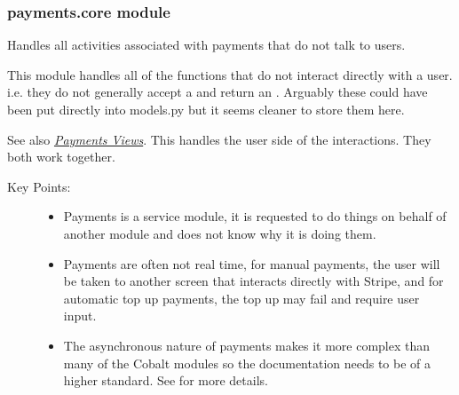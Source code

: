 \documentclass[letterpaper,10pt,english]{sphinxmanual}
\begin{document}
\subsubsection{payments.core module}
\label{\detokenize{payments:module-payments.core}}\label{\detokenize{payments:payments-core-module}}
Handles all activities associated with payments that do not talk to users.

This module handles all of the functions that do not interact directly with
a user. i.e. they do not generally accept a  and return an
. Arguably these could have been put directly into models.py
but it seems cleaner to store them here.

See also {\hyperref[\detokenize{payments:module-payments.views}]{\emph{Payments Views}}}. This handles the user side of the interactions.
They both work together.
\begin{description}
\item[{Key Points:}] \leavevmode\begin{itemize}
\item {} 
Payments is a service module, it is requested to do things on behalf of
another module and does not know why it is doing them.

\item {} 
Payments are often not real time, for manual payments, the user will
be taken to another screen that interacts directly with Stripe, and for
automatic top up payments, the top up may fail and require user input.

\item {} 
The asynchronous nature of payments makes it more complex than many of
the Cobalt modules so the documentation needs to be of a higher standard.
See  for more details.

\end{itemize}

\end{description}
\end{document}
